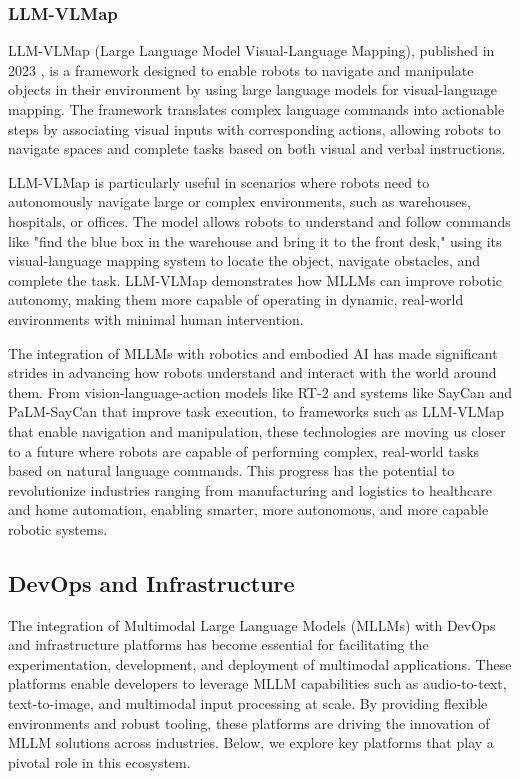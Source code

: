\subsubsection{LLM-VLMap}

LLM-VLMap (Large Language Model Visual-Language Mapping), published in 2023 \cite{chen2023llm}, is a framework designed to enable robots to navigate and manipulate objects in their environment by using large language models for visual-language mapping. 
The framework translates complex language commands into actionable steps by associating visual inputs with corresponding actions, allowing robots to navigate spaces and complete tasks based on both visual and verbal instructions.

LLM-VLMap is particularly useful in scenarios where robots need to autonomously navigate large or complex environments, such as warehouses, hospitals, or offices. 
The model allows robots to understand and follow commands like "find the blue box in the warehouse and bring it to the front desk," using its visual-language mapping system to locate the object, navigate obstacles, and complete the task. 
LLM-VLMap demonstrates how MLLMs can improve robotic autonomy, making them more capable of operating in dynamic, real-world environments with minimal human intervention.

The integration of MLLMs with robotics and embodied AI has made significant strides in advancing how robots understand and interact with the world around them. 
From vision-language-action models like RT-2 and systems like SayCan and PaLM-SayCan that improve task execution, to frameworks such as LLM-VLMap that enable navigation and manipulation, these technologies are moving us closer to a future where robots are capable of performing complex, real-world tasks based on natural language commands. 
This progress has the potential to revolutionize industries ranging from manufacturing and logistics to healthcare and home automation, enabling smarter, more autonomous, and more capable robotic systems.

\subsection{DevOps and Infrastructure}

The integration of Multimodal Large Language Models (MLLMs) with DevOps and infrastructure platforms has become essential for facilitating the experimentation, development, and deployment of multimodal applications. 
These platforms enable developers to leverage MLLM capabilities such as audio-to-text, text-to-image, and multimodal input processing at scale. 
By providing flexible environments and robust tooling, these platforms are driving the innovation of MLLM solutions across industries. 
Below, we explore key platforms that play a pivotal role in this ecosystem.


